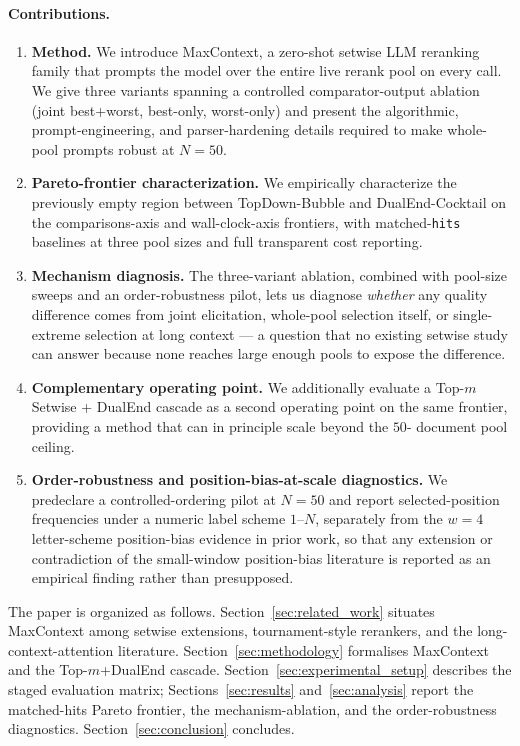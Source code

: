 \paragraph{Contributions.}
\begin{enumerate}
\item \textbf{Method.} We introduce MaxContext, a zero-shot setwise LLM
  reranking family that prompts the model over the entire live rerank pool on
  every call. We give three variants spanning a controlled comparator-output
  ablation (joint best+worst, best-only, worst-only) and present the
  algorithmic, prompt-engineering, and parser-hardening details required to
  make whole-pool prompts robust at $N{=}50$.
\item \textbf{Pareto-frontier characterization.} We empirically characterize
  the previously empty region between TopDown-Bubble and DualEnd-Cocktail on
  the comparisons-axis and wall-clock-axis frontiers, with matched-\texttt{hits}
  baselines at three pool sizes and full transparent cost reporting.
\item \textbf{Mechanism diagnosis.} The three-variant ablation, combined with
  pool-size sweeps and an order-robustness pilot, lets us diagnose
  \emph{whether} any quality difference comes from joint elicitation,
  whole-pool selection itself, or single-extreme selection at long context
  --- a question that no existing setwise study can answer because none
  reaches large enough pools to expose the difference.
\item \textbf{Complementary operating point.} We additionally evaluate a
  Top-$m$ Setwise + DualEnd cascade as a second operating point on the same
  frontier, providing a method that can in principle scale beyond the $50$-
  document pool ceiling.
\item \textbf{Order-robustness and position-bias-at-scale diagnostics.} We
  predeclare a controlled-ordering pilot at $N{=}50$ and report
  selected-position frequencies under a numeric label scheme $1$--$N$,
  separately from the $w{=}4$ letter-scheme position-bias evidence in prior
  work, so that any extension or contradiction of the small-window
  position-bias literature is reported as an empirical finding rather than
  presupposed.
\end{enumerate}

The paper is organized as follows. Section~\ref{sec:related_work} situates
MaxContext among setwise extensions, tournament-style rerankers, and the
long-context-attention literature. Section~\ref{sec:methodology} formalises
MaxContext and the Top-$m$+DualEnd cascade. Section~\ref{sec:experimental_setup}
describes the staged evaluation matrix; Sections~\ref{sec:results}
and~\ref{sec:analysis} report the matched-hits Pareto frontier, the
mechanism-ablation, and the order-robustness diagnostics.
Section~\ref{sec:conclusion} concludes.
